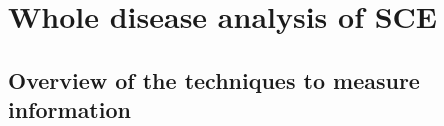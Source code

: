 



\section{Whole disease analysis of SCE}\label{methods:sce}

\subsection{Overview of the techniques to measure information}

